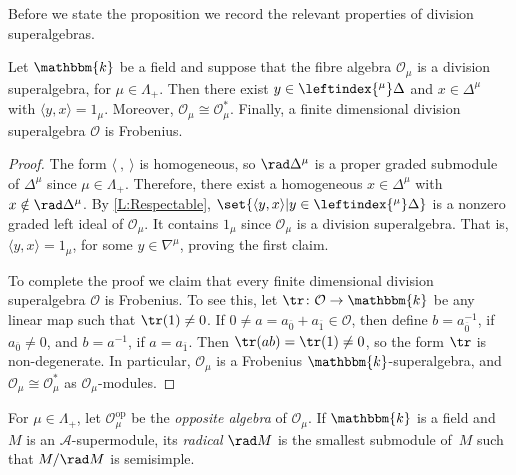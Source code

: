 \documentclass[a4paper,11pt]{amsart}
\let\<\langle
\let\>\rangle
\let\ov\overline
\numberwithin{equation}{subsection}
\theoremstyle{definition}
\theoremstyle{theorem}
\theoremstyle{remark}
\newcommand\CA{\mathcal{A}}
\newcommand\CO{\mathcal{O}}
\newcommand\Olam[1][\lambda]{\CO_{#1}}
\newcommand\kk{\mathbbm{k}}
\begin{document}
Before we state the proposition we record the relevant properties of
division superalgebras.

\begin{Lemma}\label{L:DivisionFrobenius}
  Let $\kk$ be a field and suppose that the fibre algebra $\Olam[\mu]$ is a
  division superalgebra, for $\mu\in\Lambda_+$. Then there exist
  $y\in\leftindex{^\mu}\Delta$ and $x\in\Delta^\mu$ with $\<y,x\>=1_\mu$.
  Moreover, $\Olam[\mu]\cong\Olam[\mu]^*$. Finally, a finite dimensional
  division superalgebra $\CO$ is Frobenius.
\end{Lemma}

\begin{proof}
  The form $\<\ ,\ \>$ is homogeneous, so $\rad\Delta^\mu$ is a proper graded
  submodule of $\Delta^\mu$ since $\mu\in\Lambda_+$.
  Therefore, there exist a homogeneous $x\in \Delta^\mu$
  with $x\notin\rad\Delta^\mu$. By \autoref{L:Respectable},
  $\set{\<y,x\>|y\in\leftindex{^\mu}\Delta}$ is a nonzero graded left ideal of
  $\Olam[\mu]$. It contains $1_\mu$ since $\Olam[\mu]$ is a
  division superalgebra. That is, $\<y,x\>=1_\mu$, for some $y\in\nabla^\mu$,
  proving the first claim.

 To complete the proof we claim that every finite dimensional division
 superalgebra $\CO$ is Frobenius. To see this, let $\tr\colon\CO\to\kk$
 be any linear map such that $\tr(1)\ne0$. If
 $0\ne a=a_{\ov0}+a_{\ov1}\in\CO$, then define $b=a_{\ov0}^{-1}$, if
 $a_{\ov0}\ne0$, and $b=a^{-1}$, if $a=a_{\ov1}$. Then
 $\tr(ab)=\tr(1)\ne0$, so the form $\tr$ is non-degenerate. In
 particular, $\Olam[\mu]$ is a Frobenius $\kk$-superalgebra, and
 $\Olam[\mu]\cong\Olam[\mu]^*$ as $\Olam[\mu]$-modules.
\end{proof}


For $\mu\in\Lambda_+$, let $\Olam[\mu]^{\mathrm{op}}$ be the
\emph{opposite algebra} of $\Olam[\mu]$. If $\kk$ is a field and $M$ is an
$\CA$-supermodule, its \emph{radical} $\rad M$ is the smallest
submodule of~$M$ such that $M/\rad M$ is semisimple.
\end{document}

